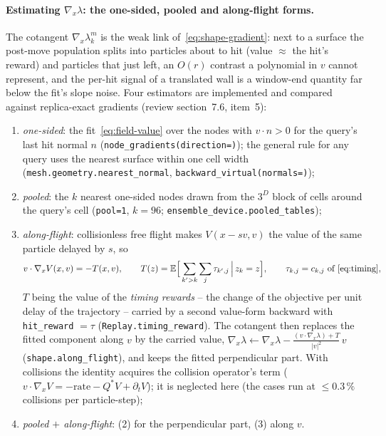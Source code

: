\documentclass[11pt,a4paper]{article}
\numberwithin{equation}{section}
\newcommand{\E}{\mathbb{E}}
\newcommand{\code}[1]{\texttt{#1}}
\begin{document}
\paragraph{Estimating $\nabla_x\lambda$: the one-sided, pooled and along-flight forms.}
The cotangent $\nabla_x\lambda^m_k$ is the weak link of~\eqref{eq:shape-gradient}: next
to a surface the post-move population splits into particles about to hit (value
$\approx$ the hit's reward) and particles that just left, an $O(r)$ contrast a
polynomial in $v$ cannot represent, and the per-hit signal of a translated wall is a
window-end quantity far below the fit's slope noise.  Four estimators are implemented
and compared against replica-exact gradients (review section~7.6, item~5):
\begin{enumerate}
\item \emph{one-sided}: the fit~\eqref{eq:field-value} over the nodes with
  $v\cdot n > 0$ for the query's last hit normal $n$ (\code{node\_gradients(direction=)});
  the general rule for any query uses the nearest surface within one cell width
  (\code{mesh.geometry.nearest\_normal}, \code{backward\_virtual(normals=)});
\item \emph{pooled}: the $k$ nearest one-sided nodes drawn from the $3^D$ block of cells
  around the query's cell (\code{pool=1}, $k = 96$; \code{ensemble\_device.pooled\_tables});
\item \emph{along-flight}: collisionless free flight makes $V(x - s v, v)$ the value of
  the same particle delayed by $s$, so
  \begin{equation}
  \label{eq:along-flight}
  v\cdot\nabla_x V(x, v) = -T(x, v),\qquad
  T(z) = \E\Big[\sum_{k' > k}\sum_j \tau_{k',j}\,\Big|\,z_k = z\Big],\qquad
  \tau_{k,j} = c_{k,j}\ \text{of~\eqref{eq:timing}},
  \end{equation}
  $T$ being the value of the \emph{timing rewards} -- the change of the objective per
  unit delay of the trajectory -- carried by a second value-form backward with
  \code{hit\_reward} $= \tau$ (\code{Replay.timing\_reward}).  The cotangent then
  replaces the fitted component along $v$ by the carried value,
  $\nabla_x\lambda \leftarrow \nabla_x\lambda - \frac{(v\cdot\nabla_x\lambda) + T}{|v|^2}\,v$
  (\code{shape.along\_flight}), and keeps the fitted perpendicular part.  With
  collisions the identity acquires the collision operator's term ($v\cdot\nabla_x V =
  -\text{rate} - Q^*V + \partial_t V$); it is neglected here (the cases run at
  $\le 0.3\,\%$ collisions per particle-step);
\item \emph{pooled $+$ along-flight}: (2) for the perpendicular part, (3) along $v$.
\end{enumerate}
\end{document}
